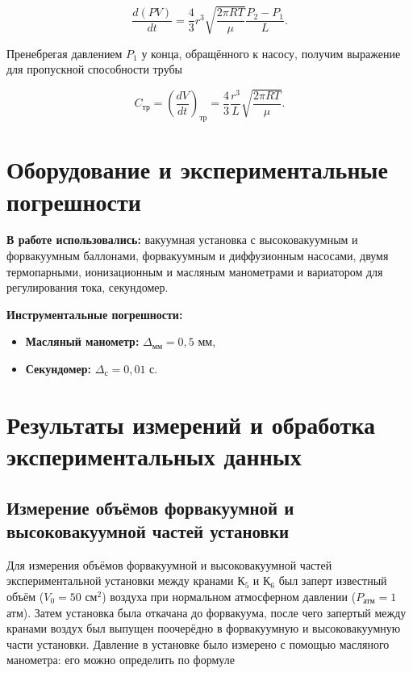 \documentclass[a4paper,12pt]{article} %
\begin{document}
\begin{equation}
    \frac{d(PV)}{dt} = \frac{4}{3}r^3\sqrt{\frac{2\pi RT}{\mu}}\frac{P_2 - P_1}{L}.
    \label{throughput}
\end{equation}

Пренебрегая давлением $P_1$ у конца, обращённого к насосу, получим выражение для пропускной способности трубы

\begin{equation}
    C_\text{тр} = (\frac{dV}{dt})_\text{тр} = \frac{4}{3}\frac{r^3}{L}\sqrt{\frac{2\pi RT}{\mu}}.
\end{equation}

\section{Оборудование и экспериментальные погрешности}

\textbf{В работе использовались:} вакуумная установка с высоковакуумным и форвакуумным баллонами, форвакуумным и диффузионным насосами, двумя термопарными, ионизационным и масляным манометрами и вариатором для регулирования тока, секундомер. 

\textbf{Инструментальные погрешности:}

\begin{itemize}
    \item \textbf{Масляный манометр:} $\Delta_\text{мм} = 0,5$ мм,
    \item \textbf{Секундомер:} $\Delta_\text{с} = 0,01 $ с.
\end{itemize}

\section{Результаты измерений и обработка экспериментальных данных}

\subsection{Измерение объёмов форвакуумной и высоковакуумной частей установки}

Для измерения объёмов форвакуумной и высоковакуумной частей экспериментальной установки между кранами $\text{К}_5$ и $\text{К}_6$ был заперт известный объём ($V_0 = 50 \text{ см}^2$) воздуха при нормальном атмосферном давлении ($P_\text{атм} = 1 $ атм). Затем установка была откачана до форвакуума, после чего запертый между кранами воздух был выпущен поочерёдно в форвакуумную и высоковакуумную части установки. Давление в установке было измерено с помощью масляного манометра: его можно определить по формуле
\end{document}
